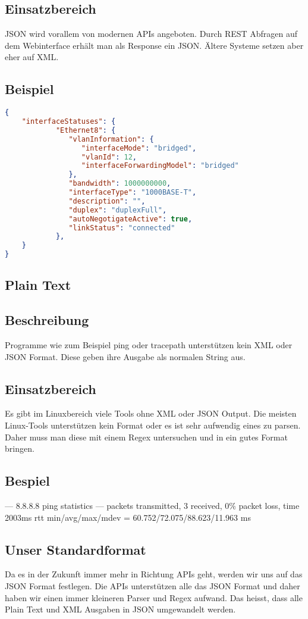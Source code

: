 \documentclass[a4,12pt]{scrartcl}
\begin{document}
\subsection{Einsatzbereich}
JSON wird vorallem von modernen APIs angeboten. Durch REST Abfragen auf dem Webinterface erhält man als Response ein JSON. Ältere Systeme setzen aber eher auf XML.
\subsection{Beispiel}
\begin{lstlisting}[language=json,firstnumber=1]
{
	"interfaceStatuses": {
            "Ethernet8": {
               "vlanInformation": {
                  "interfaceMode": "bridged",
                  "vlanId": 12,
                  "interfaceForwardingModel": "bridged"
               },
               "bandwidth": 1000000000,
               "interfaceType": "1000BASE-T",
               "description": "",
               "duplex": "duplexFull",
               "autoNegotigateActive": true,
               "linkStatus": "connected"
            },
	}
}
\end{lstlisting}
\subsection{Plain Text}
\subsection{Beschreibung}
Programme wie zum Beispiel ping oder tracepath unterstützen kein XML oder JSON Format. Diese geben ihre Ausgabe als normalen String aus. 
\subsection{Einsatzbereich}
Es gibt im Linuxbereich viele Tools ohne XML oder JSON Output. Die meisten Linux-Tools unterstützen kein Format oder es ist sehr aufwendig eines zu parsen. Daher muss man diese mit einem Regex untersuchen und in ein gutes Format bringen.
\subsection{Bespiel}
--- 8.8.8.8 ping statistics --- packets transmitted, 3 received, 0\% packet loss, time 2003ms\newline
rtt min/avg/max/mdev = 60.752/72.075/88.623/11.963 ms\newline

\subsection{Unser Standardformat}
Da es in der Zukunft immer mehr in Richtung APIs geht, werden wir uns auf das JSON Format festlegen. Die APIs unterstützen alle das JSON Format und daher haben wir einen immer kleineren Parser und Regex aufwand. Das heisst, dass alle Plain Text und XML Ausgaben in JSON umgewandelt werden.
\end{document}
